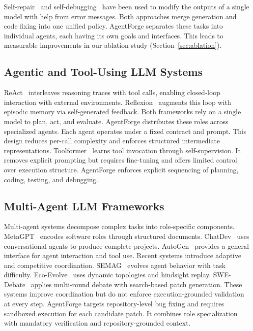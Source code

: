 \documentclass[journal]{IEEEtran}
\begin{document}
Self-repair~\cite{olausson2023selfrepair} and self-debugging~\cite{chen2023teaching} have been used to modify the outputs of a single model with help from error messages. Both approaches merge generation and code fixing into one unified policy. AgentForge separates these tasks into individual agents, each having its own goals and interfaces. This leads to measurable improvements in our ablation study (Section~\ref{sec:ablation}).

\subsection{Agentic and Tool-Using LLM Systems}

ReAct~\cite{yao2023react} interleaves reasoning traces with tool calls, enabling closed-loop interaction with external environments. Reflexion~\cite{shinn2023reflexion} augments this loop with episodic memory via self-generated feedback. Both frameworks rely on a single model to plan, act, and evaluate. AgentForge distributes these roles across specialized agents. Each agent operates under a fixed contract and prompt. This design reduces per-call complexity and enforces structured intermediate representations. Toolformer~\cite{schick2023toolformer} learns tool invocation through self-supervision. It removes explicit prompting but requires fine-tuning and offers limited control over execution structure. AgentForge enforces explicit sequencing of planning, coding, testing, and debugging.

\subsection{Multi-Agent LLM Frameworks}

Multi-agent systems decompose complex tasks into role-specific components. MetaGPT~\cite{hong2023metagpt} encodes software roles through structured documents. ChatDev~\cite{qian2023chatdev} uses conversational agents to produce complete projects. AutoGen~\cite{wu2023autogen} provides a general interface for agent interaction and tool use. Recent systems introduce adaptive and competitive coordination. SEMAG~\cite{semag2026} evolves agent behavior with task difficulty. Eco-Evolve~\cite{ecoevolve2026} uses dynamic topologies and hindsight replay. SWE-Debate~\cite{swedebate2026} applies multi-round debate with search-based patch generation. These systems improve coordination but do not enforce execution-grounded validation at every step. AgentForge targets repository-level bug fixing and requires sandboxed execution for each candidate patch. It combines role specialization with mandatory verification and repository-grounded context.
\end{document}
